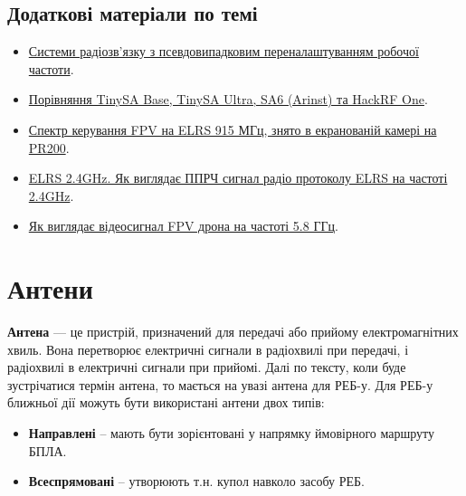 \documentclass{article}
\begin{document}
\subsection{Додаткові матеріали по темі}

\begin{itemize}[noitemsep, topsep=8pt]
\item \href{https://sprotyvg7.com.ua/lesson/sistemi-radiozvyazku-z-pprch}{Системи радіозв'язку з псевдовипадковим переналаштуванням робочої частоти}.
\item \href{https://www.youtube.com/watch?v=KCj1-SM9aAA}{Порівняння TinySA Base, TinySA Ultra, SA6 (Arinst) та HackRF One}.
\item \href{https://www.youtube.com/watch?v=eFXym8-Yzt0}{Спектр керування FPV на ELRS 915 МГц, знято в екранованій камері на PR200}.
\item \href{https://www.youtube.com/watch?v=REyNJcrZHII}{ELRS 2.4GHz. Як виглядає ППРЧ сигнал радіо протоколу ELRS на частоті 2.4GHz}.
\item \href{https://www.youtube.com/watch?v=XzFMRYEYVXM}{Як виглядає відеосигнал FPV дрона на частоті 5.8 ГГц}.
\end{itemize}

\section{Антени}
\textbf{Антена} --- це пристрій, призначений для передачі або прийому електромагнітних хвиль. Вона перетворює електричні сигнали в радіохвилі при передачі, і радіохвилі в електричні сигнали при прийомі. Далі по тексту, коли буде зустрічатися термін антена, то мається на увазі антена для РЕБ-у. Для РЕБ-у ближньої дії можуть бути використані антени двох типів:

\begin{itemize}[noitemsep, topsep=8pt]
\item \textbf{Направлені} -- мають бути зорієнтовані у напрямку ймовірного маршруту БПЛА.
\item \textbf{Всеспрямовані} -- утворюють т.н. купол навколо засобу РЕБ.
\end{itemize}
\end{document}
